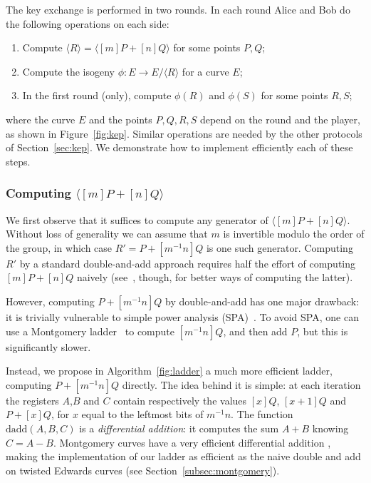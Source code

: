 \documentclass[jmc]{degruyter-journal-a}
\theoremstyle{definition}
\newcommand{\cyc}[1]{{\langle #1 \rangle}}
\begin{document}
The key exchange is performed in two rounds. In each round Alice and
Bob do the following operations on each side:
\begin{enumerate}
\item\label{step:muladd} Compute $\cyc{R}=\cyc{[m]P+[n]Q}$ for some points $P,Q$;
\item\label{step:isogeny} Compute the isogeny $\phi:E\to E/\cyc{R}$ for a curve $E$;
\item\label{step:push} In the first round (only), compute $\phi(R)$
  and $\phi(S)$ for some points $R,S$;
\end{enumerate}
where the curve $E$ and the points $P,Q,R,S$ depend on the round and
the player, as shown in Figure~\ref{fig:kep}. Similar operations are
needed by the other protocols of Section~\ref{sec:kep}. We demonstrate
how to implement efficiently each of these steps.

\subsubsection{Computing $\cyc{[m]P+[n]Q}$}\label{sssec:muladd}

We first observe that it suffices to compute any generator of
$\cyc{[m]P+[n]Q}$. Without loss of generality we can assume that $m$
is invertible modulo the order of the group, in which case $R' = P +
[m^{-1}n]Q$ is one such generator. Computing $R'$ by a standard
double-and-add approach requires half the effort of computing
$[m]P+[n]Q$ naively
(see~\cite{elgamal,solinas01,antipa+brown+gallant+lambert+struik+vanstone06},
though, for better ways of computing the latter).

However, computing $P+[m^{-1}n]Q$ by double-and-add has one major
drawback: it is trivially vulnerable to simple power analysis
(SPA)~\cite{kocher+jaffe+jun99}. To avoid SPA, one can use a Montgomery
ladder~\cite{montgomery} to compute $[m^{-1}n]Q$, and then add $P$, but
this is significantly slower.

Instead, we propose in Algorithm~\ref{fig:ladder} a much more efficient ladder,
computing $P+[m^{-1}n]Q$ directly. The idea behind it is simple: at
each iteration the registers $A$,$B$ and $C$ contain respectively the
values $[x]Q$, $[x+1]Q$ and $P+[x]Q$, for $x$ equal to the leftmost
bits of $m^{-1}n$. The function $\mathrm{dadd}(A,B,C)$ is a
\emph{differential addition}: it computes the sum $A+B$ knowing
$C=A-B$. Montgomery curves have a very efficient differential addition
\cite{montgomery}, making the implementation of our ladder as
efficient as the naive double and add on twisted Edwards curves (see
Section~\ref{subsec:montgomery}).
\end{document}
